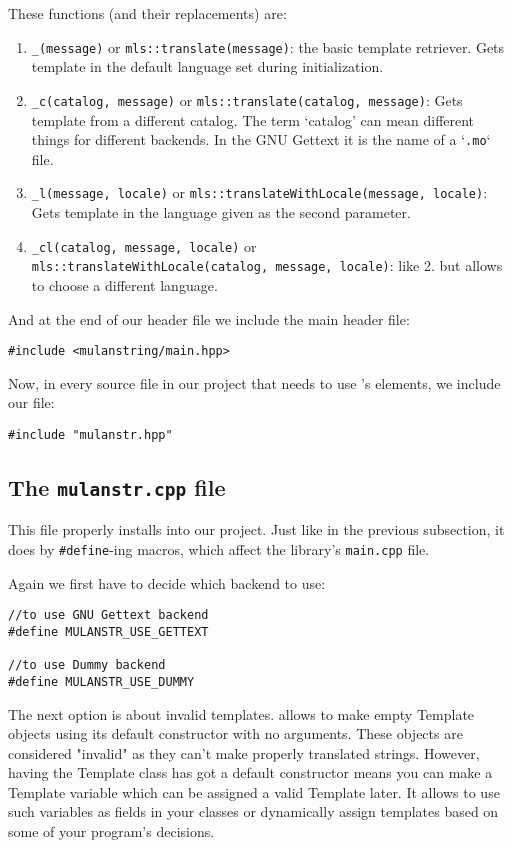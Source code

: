 These functions (and their replacements) are:
\begin{enumerate}
	\item \texttt{\_(message)} or \texttt{mls::translate(message)}: the basic template retriever. Gets template in the default language set during initialization.
	\item \texttt{\_c(catalog, message)} or \texttt{mls::translate(catalog, message)}: Gets template from a different catalog. 
	The term `catalog' can mean different things for different backends. In the GNU Gettext it is the name of a `\texttt{.mo}` file.
	\item \texttt{\_l(message, locale)} or \texttt{mls::translateWithLocale(message, locale)}: Gets template in the language given as the second parameter. 
	\item \texttt{\_cl(catalog, message, locale)} or\\ \texttt{mls::translateWithLocale(}\texttt{catalog, message, locale)}: like 2. but allows to choose a different language.
\end{enumerate}

And at the end of our header file we include the \mulan{} main header file:
\begin{verbatim}
#include <mulanstring/main.hpp>
\end{verbatim}

Now, in every source file in our project that needs to use \mulan{}'s elements, we include our file:
\begin{verbatim}
#include "mulanstr.hpp"
\end{verbatim}

\subsection{The \texttt{mulanstr.cpp} file}
This file properly installs \mulan{} into our project. 
Just like in the previous subsection, it does by \verb+#define+-ing macros, which affect the library's \verb+main.cpp+ file.

Again we first have to decide which backend to use:
\begin{verbatim}
//to use GNU Gettext backend
#define MULANSTR_USE_GETTEXT

//to use Dummy backend
#define MULANSTR_USE_DUMMY
\end{verbatim}

The next option is about invalid templates. \mulan{} allows to make empty Template objects using its default constructor with no arguments.
These objects are considered "invalid" as they can't make properly translated strings. 
However, having the Template class has got a default constructor means you can make a Template variable which can be assigned a valid Template later.
It allows to use such variables as fields in your classes or dynamically assign templates based on some of your program's decisions. 

